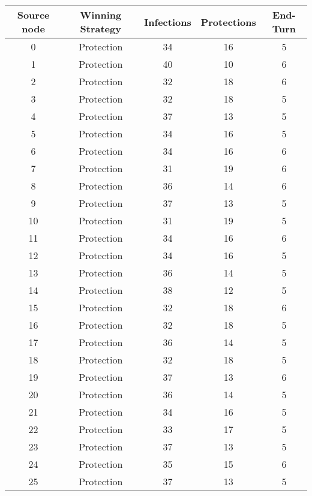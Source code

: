 \documentclass[results.tex]{subfiles}
\begin{document}
\begin{center}
  \begin{tabular}{| c || c | c | c | c |}
    \hline
    {\bfseries Source node} & {\bfseries Winning Strategy} & {\bfseries Infections} & {\bfseries Protections} & {\bfseries End-Turn} \\  %
    \hline\hline
    0 & Protection & 34 & 16 & 5 \\ 
    \hline
    1 & Protection & 40 & 10 & 6 \\ 
    \hline
    2 & Protection & 32 & 18 & 6 \\ 
    \hline
    3 & Protection & 32 & 18 & 5 \\ 
    \hline
    4 & Protection & 37 & 13 & 5 \\ 
    \hline
    5 & Protection & 34 & 16 & 5 \\ 
    \hline
    6 & Protection & 34 & 16 & 6 \\ 
    \hline
    7 & Protection & 31 & 19 & 6 \\ 
    \hline
    8 & Protection & 36 & 14 & 6 \\ 
    \hline
    9 & Protection & 37 & 13 & 5 \\ 
    \hline
    10 & Protection & 31 & 19 & 5 \\ 
    \hline
    11 & Protection & 34 & 16 & 6 \\ 
    \hline
    12 & Protection & 34 & 16 & 5 \\ 
    \hline
    13 & Protection & 36 & 14 & 5 \\ 
    \hline
    14 & Protection & 38 & 12 & 5 \\ 
    \hline
    15 & Protection & 32 & 18 & 6 \\ 
    \hline
    16 & Protection & 32 & 18 & 5 \\ 
    \hline
    17 & Protection & 36 & 14 & 5 \\ 
    \hline
    18 & Protection & 32 & 18 & 5 \\ 
    \hline
    19 & Protection & 37 & 13 & 6 \\ 
    \hline
    20 & Protection & 36 & 14 & 5 \\ 
    \hline
    21 & Protection & 34 & 16 & 5 \\ 
    \hline
    22 & Protection & 33 & 17 & 5 \\ 
    \hline
    23 & Protection & 37 & 13 & 5 \\ 
    \hline
    24 & Protection & 35 & 15 & 6 \\ 
    \hline
    25 & Protection & 37 & 13 & 5 \\ 

\end{tabular}
\end{center}
\end{document}
